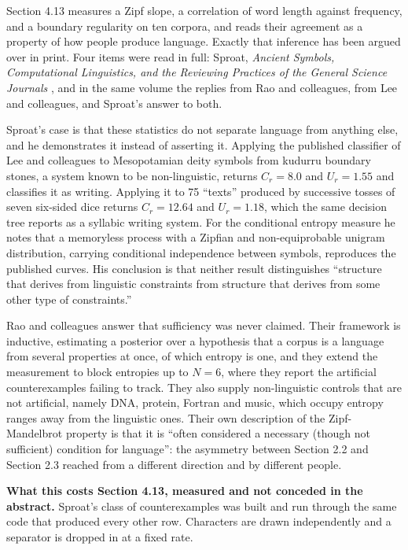 Section 4.13 measures a Zipf slope, a correlation of word length against frequency, and a boundary regularity on ten corpora, and reads their agreement as a property of how people produce language. Exactly that inference has been argued over in print. Four items were read in full: Sproat, \emph{Ancient Symbols, Computational Linguistics, and the Reviewing Practices of the General Science Journals} \cite{src:Sproat}, and in the same volume the replies from Rao and colleagues, from Lee and colleagues, and Sproat's answer to both.

Sproat's case is that these statistics do not separate language from anything else, and he demonstrates it instead of asserting it. Applying the published classifier of Lee and colleagues to Mesopotamian deity symbols from kudurru boundary stones, a system known to be non-linguistic, returns \(C_r = 8.0\) and \(U_r = 1.55\) and classifies it as writing. Applying it to 75 ``texts'' produced by successive tosses of seven six-sided dice returns \(C_r = 12.64\) and \(U_r = 1.18\), which the same decision tree reports as a syllabic writing system. For the conditional entropy measure he notes that a memoryless process with a Zipfian and non-equiprobable unigram distribution, carrying conditional independence between symbols, reproduces the published curves. His conclusion is that neither result distinguishes ``structure that derives from linguistic constraints from structure that derives from some other type of constraints.''

Rao and colleagues answer that sufficiency was never claimed. Their framework is inductive, estimating a posterior over a hypothesis that a corpus is a language from several properties at once, of which entropy is one, and they extend the measurement to block entropies up to \(N = 6\), where they report the artificial counterexamples failing to track. They also supply non-linguistic controls that are not artificial, namely DNA, protein, Fortran and music, which occupy entropy ranges away from the linguistic ones. Their own description of the Zipf-Mandelbrot property is that it is ``often considered a necessary (though not sufficient) condition for language'': the asymmetry between Section 2.2 and Section 2.3 reached from a different direction and by different people.

\noindent\textbf{What this costs Section 4.13, measured and not conceded in the abstract.} Sproat's class of counterexamples was built and run through the same code that produced every other row. Characters are drawn independently and a separator is dropped in at a fixed rate.

